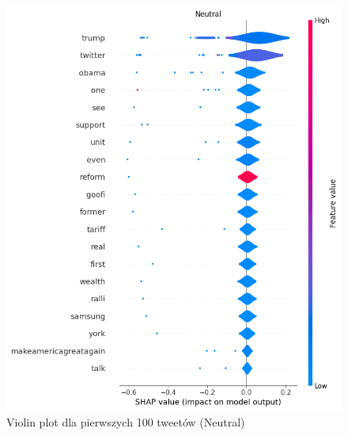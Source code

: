 \documentclass{article}
\begin{document}
\begin{figure}[H]
    \centering
    \includegraphics[width=\textwidth]{assets/violin_neutral.png}
    \caption{Violin plot dla pierwszych 100 tweetów (Neutral)}
\end{figure}
\end{document}
